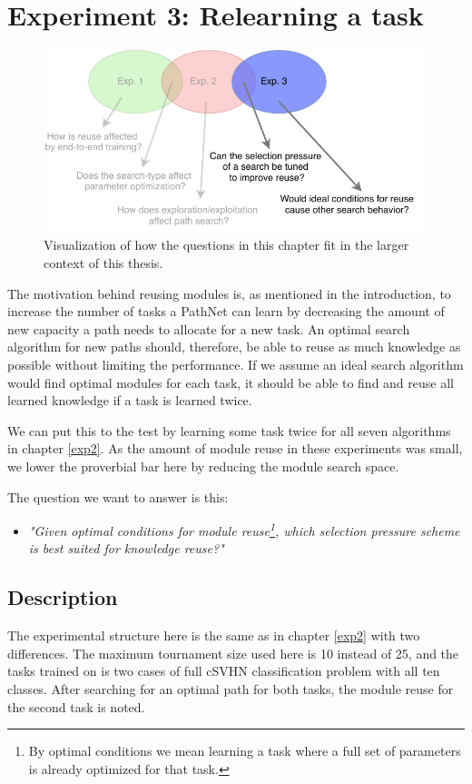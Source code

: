 \chapter{Experiment 3: Relearning a task}
\label{exp3}

\begin{figure}[hb]
    \includegraphics[width=\textwidth]{Chapters/4.Experiments/exp3/figures/exp3.pdf}
    \caption[Experiment focus]{Visualization of how the questions in this chapter fit in the larger context of this thesis.}
    \label{fig:exp3.questions}
\end{figure}

The motivation behind reusing modules is, as mentioned in the introduction, to increase the number of tasks a PathNet can learn by decreasing the amount of new capacity a path needs to allocate for a new task. An optimal search algorithm for new paths should, therefore, be able to reuse as much knowledge as possible without limiting the performance. If we assume an ideal search algorithm would find optimal modules for each task, it should be able to find and reuse all learned knowledge if a task is learned twice. 

We can put this to the test by learning some task twice for all seven algorithms in chapter \ref{exp2}. As the amount of module reuse in these experiments was small, we lower the proverbial bar here by reducing the module search space.

The question we want to answer is this: 
\begin{itemize}
    \item \emph{"Given optimal conditions for module reuse\footnote{By optimal conditions we mean learning a task where a full set of parameters is already optimized for that task.}, which selection pressure scheme is best suited for knowledge reuse?"}
\end{itemize}


\section{Description}
The experimental structure here is the same as in chapter \ref{exp2} with two differences. The maximum tournament size used here is 10 instead of 25, and the tasks trained on is two cases of full cSVHN classification problem with all ten classes. After searching for an optimal path for both tasks, the module reuse for the second task is noted. 

